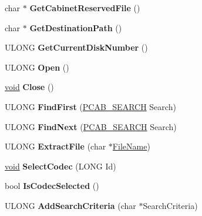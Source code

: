\begin{DoxyCompactItemize}
char $\ast$ {\bfseries Get\+Cabinet\+Reserved\+File} ()
\item 
\mbox{\label{class_c_cabinet_a0a80e03eedf2b9925d1a9caf3cb4bcaf}} 
char $\ast$ {\bfseries Get\+Destination\+Path} ()
\item 
\mbox{\label{class_c_cabinet_ad7b06ee32be3e42a7b8de154974b3729}} 
U\+L\+O\+NG {\bfseries Get\+Current\+Disk\+Number} ()
\item 
\mbox{\label{class_c_cabinet_a7e4ff23e18544eb34df1939b545b25e7}} 
U\+L\+O\+NG {\bfseries Open} ()
\item 
\mbox{\label{class_c_cabinet_a0816707d0eb475fc652544bc37f8c19d}} 
\hyperlink{interfacevoid}{void} {\bfseries Close} ()
\item 
\mbox{\label{class_c_cabinet_a382b0db7df85abe0881cac76810accbc}} 
U\+L\+O\+NG {\bfseries Find\+First} (\hyperlink{struct___c_a_b___s_e_a_r_c_h}{P\+C\+A\+B\+\_\+\+S\+E\+A\+R\+CH} Search)
\item 
\mbox{\label{class_c_cabinet_a92ef4d29da6d6c1035482d21d24fbfa1}} 
U\+L\+O\+NG {\bfseries Find\+Next} (\hyperlink{struct___c_a_b___s_e_a_r_c_h}{P\+C\+A\+B\+\_\+\+S\+E\+A\+R\+CH} Search)
\item 
\mbox{\label{class_c_cabinet_a77bff922b17b9017be1c39e28360af01}} 
U\+L\+O\+NG {\bfseries Extract\+File} (char $\ast$\hyperlink{struct___file_name}{File\+Name})
\item 
\mbox{\label{class_c_cabinet_a851e7e1b29c865bb3135ae6cc06d0535}} 
\hyperlink{interfacevoid}{void} {\bfseries Select\+Codec} (L\+O\+NG Id)
\item 
\mbox{\label{class_c_cabinet_a6b5ebd603ae35361677c4139e9cc0b67}} 
bool {\bfseries Is\+Codec\+Selected} ()
\item 
\mbox{\label{class_c_cabinet_ad83c2e6e193706d803af8a3c22ae69f9}} 
U\+L\+O\+NG {\bfseries Add\+Search\+Criteria} (char $\ast$Search\+Criteria)
\item 
\mbox{\label{class_c_cabinet_a11fc9edd497b1ce6935d98cfffb05cf6}} 

\end{DoxyCompactItemize}
